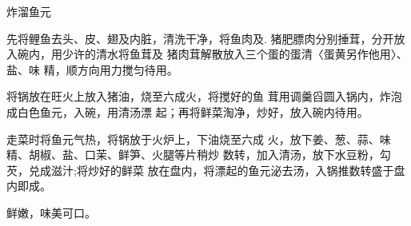 \begin{recipe}{炸溜鱼元}

\ingredients



\cooking

\step 	先将鲤鱼去头、皮、翅及内脏，清洗干净，将鱼肉及. 猪肥膘肉分别捶茸，分开放入碗内，用少许的清水将鱼茸及 猪肉茸解散放入三个蛋的蛋清〈蛋黄另作他用〉、盐、味 精，顺方向用力搅匀待用。

\step 	将锅放在旺火上放入猪油，烧至六成火，将搅好的鱼 茸用调羹舀圆入锅内，炸泡成白色鱼元，入碗，用清汤漂 起；再将鲜菜淘净，炒好，放入碗内待用。

\step 	走菜时将鱼元气热，将锅放于火炉上，下油烧至六成 火，放下姜、葱、蒜、味精、胡椒、盐、口茉、鲜笋、火腿等片稍炒 数转，加入清汤，放下水豆粉，勾芡，兑成滋汁;将炒好的鲜菜 放在盘内，将漂起的鱼元泌去汤，入锅推数转盛于盘内即成。

\notes

鲜嫩，味美可口。

\end{recipe}

